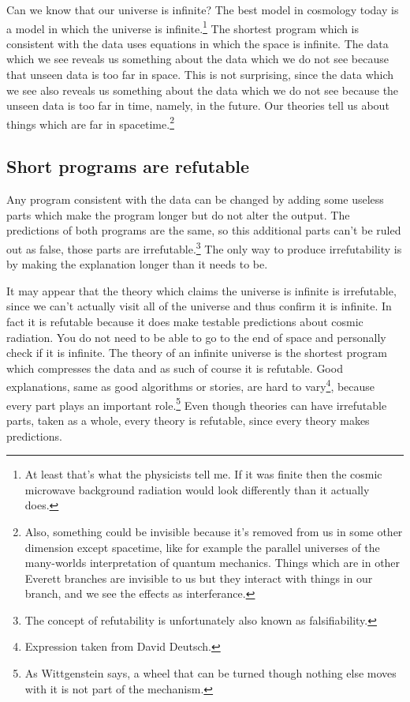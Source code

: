 \documentclass[oneside,hidelinks]{article}
\begin{document}
Can we know that our universe is infinite?
The best model in cosmology today is a model in which the universe is infinite.\footnote{
At least that's what the physicists tell me.
If it was finite then the cosmic microwave background radiation would look differently than it actually does.
}
The shortest program which is consistent with the data uses equations in which the space is infinite.
The data which we see reveals us something about the data which we do not see because that unseen data is too far in space.
This is not surprising, since the data which we see also reveals us something about the data which we do not see because the unseen data is too far in time, namely, in the future.
Our theories tell us about things which are far in spacetime.\footnote{
Also, something could be invisible because it's removed from us in some other dimension except spacetime, like for example the parallel universes of the many-worlds interpretation of quantum mechanics.
Things which are in other Everett branches are invisible to us but they interact with things in our branch, and we see the effects as interferance.
}

\newpage

\subsection{Short programs are refutable}

Any program consistent with the data can be changed by adding some useless parts which make the program longer but do not alter the output.
The predictions of both programs are the same, so this additional parts can't be ruled out as false, those parts are irrefutable.\footnote{
The concept of refutability is unfortunately also known as falsifiability.
}
The only way to produce irrefutability is by making the explanation longer than it needs to be.

It may appear that the theory which claims the universe is infinite is irrefutable, since we can't actually visit all of the universe and thus confirm it is infinite.
In fact it is refutable because it does make testable predictions about cosmic radiation.
You do not need to be able to go to the end of space and personally check if it is infinite.
The theory of an infinite universe is the shortest program which compresses the data and as such of course it is refutable.
Good explanations, same as good algorithms or stories, are hard to vary\footnote{Expression taken from David Deutsch.}, because every part plays an important role.\footnote{As Wittgenstein says, a wheel that can be turned though nothing else moves with it is not part of the mechanism.}
Even though theories can have irrefutable parts, taken as a whole, every theory is refutable, since every theory makes predictions.
\end{document}
